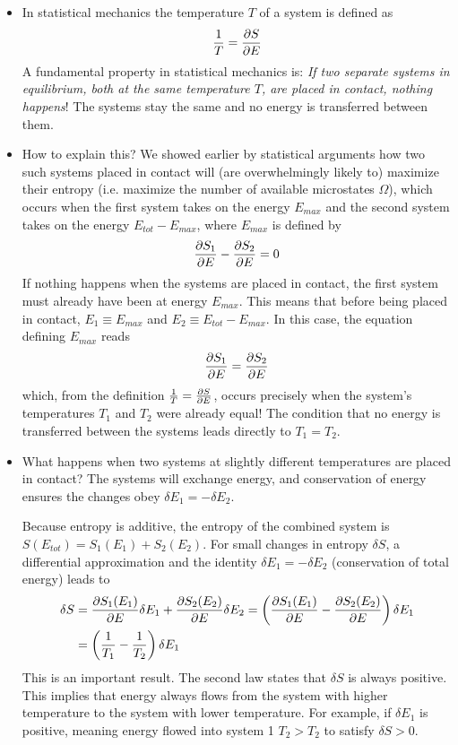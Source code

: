 \documentclass[11pt, a4paper]{article}
\begin{document}
\begin{itemize}
	\item In statistical mechanics the temperature $ T $ of a system is defined as
	\begin{equation*}
		\frac{1}{T} = \pdv{S}{E}
	\end{equation*}
	A fundamental property in statistical mechanics is: \textit{If two separate systems in equilibrium, both at the same temperature $ T $, are placed in contact, nothing happens}! The systems stay the same and no energy is transferred between them.
	
	\item How to explain this? We showed earlier by statistical arguments how two such systems placed in contact will (are overwhelmingly likely to) maximize their entropy (i.e. maximize the number of available microstates $ \Omega $), which occurs when the first system takes on the energy $ E_{max} $ and the second system takes on the energy $ E_{tot} - E_{max} $, where $ E_{max} $ is defined by
	\begin{equation*}
		\pdv{S_{1}}{E} (E_{max}) - \pdv{S_{2}}{E} (E_{tot} - E_{max}) = 0
	\end{equation*}
	If nothing happens when the systems are placed in contact, the first system must already have been at energy $ E_{max} $. This means that before being placed in contact, $ E_{1} \equiv E_{max} $ and $ E_{2} \equiv E_{tot} - E_{max} $. In this case, the equation defining $ E_{max} $ reads
	\begin{equation*}
		\pdv{S_{1}}{E} (E_{1}) = \pdv{S_{2}}{E} (E_{2})
	\end{equation*}
	which, from the definition $ \frac{1}{T} = \pdv{S}{E} $, occurs precisely when the system's temperatures $ T_{1} $ and $ T_{2} $ were already equal! The condition that no energy is transferred between the systems leads directly to $ T_{1} = T_{2} $.
	
	\item What happens when two systems at slightly different temperatures are placed in contact? The systems will exchange energy, and conservation of energy ensures the changes obey $ \delta E_{1} = -\delta E_{2} $. 
	
	Because entropy is additive, the entropy of the combined system is $ S(E_{tot}) = S_{1}(E_{1}) + S_{2}(E_{2}) $. For small changes in entropy $ \delta S $, a differential approximation and the identity $ \delta E_{1} = -\delta E_{2}  $ (conservation of total energy) leads to
	\begin{align*}
		\delta S &= \pdv{S_{1}(E_{1})}{E}\delta E_{1} + \pdv{S_{2}(E_{2})}{E}\delta E_{2} = \left( \pdv{S_{1}(E_{1})}{E} - \pdv{S_{2}(E_{2})}{E} \right)\delta E_{1}\\
		&=\left(\frac{1}{T_{1}} - \frac{1}{T_{2}}\right) \delta E_{1}
	\end{align*}
	This is an important result. The second law states that $ \delta S $ is always positive. This implies that energy always flows from the system with higher temperature to the system with lower temperature. For example, if $ \delta E_{1} $ is positive, meaning energy flowed into system 1 $ T_{2} > T_{2} $ to satisfy $ \delta S > 0 $.
	

\end{itemize}
\end{document}
